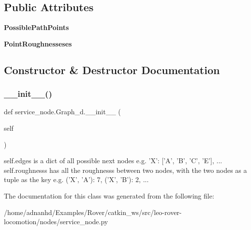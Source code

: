 \subsection*{Public Attributes}
\begin{DoxyCompactItemize}
\item 
\mbox{\label{classservice__node_1_1Graph__d_ac8312e991685daf3d8ae7f1c89734287}} 
{\bfseries Possible\+Path\+Points}
\item 
\mbox{\label{classservice__node_1_1Graph__d_a7a94a0789e58110d2e5fece70623f53c}} 
{\bfseries Point\+Roughnesseses}
\end{DoxyCompactItemize}


\subsection{Constructor \& Destructor Documentation}
\mbox{\label{classservice__node_1_1Graph__d_a76ed82f1e5e08fb2fbd979a1c7a988ee}} 
\subsubsection{\texorpdfstring{\+\_\+\+\_\+init\+\_\+\+\_\+()}{\_\_init\_\_()}}
{\footnotesize\ttfamily def service\+\_\+node.\+Graph\+\_\+d.\+\_\+\+\_\+init\+\_\+\+\_\+ (\begin{DoxyParamCaption}\item[{}]{self }\end{DoxyParamCaption})}

\begin{DoxyVerb}self.edges is a dict of all possible next nodes
e.g. {'X': ['A', 'B', 'C', 'E'], ...}
self.roughnesss has all the roughnesss between two nodes,
with the two nodes as a tuple as the key
e.g. {('X', 'A'): 7, ('X', 'B'): 2, ...}
\end{DoxyVerb}
 

The documentation for this class was generated from the following file\+:\begin{DoxyCompactItemize}
\item 
/home/adnanhd/\+Examples/\+Rover/catkin\+\_\+ws/src/leo-\/rover-\/locomotion/nodes/service\+\_\+node.\+py\end{DoxyCompactItemize}
